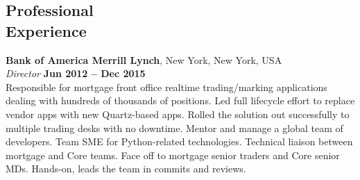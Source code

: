 \documentclass[margin,line]{resume}
\begin{document}
\begin{resume}



    \section{\mysidestyle Professional\\Experience}

    \textbf{Bank of America Merrill Lynch}, New York, New York, USA \vspace{2mm}\\\vspace{1mm}%
    \textsl{Director} \hfill \textbf{Jun 2012 -- Dec 2015}\\
    Responsible for mortgage front office realtime trading/marking applications dealing with hundreds of thousands of
    positions. Led full lifecycle effort to replace vendor apps with new Quartz-based apps. Rolled the solution
    out successfully to multiple trading desks with no downtime. Mentor and manage a global team of developers. 
    Team SME for Python-related technologies. Technical liaison between mortgage and Core teams. 
    Face off to mortgage senior traders and Core senior MDs. Hands-on, leads the team in commits and reviews.


\end{resume}
\end{document}
